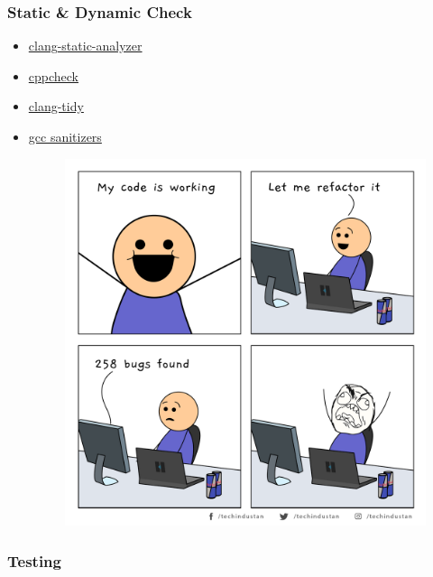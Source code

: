 \documentclass{beamer}
\begin{document}
\begin{frame}
\frametitle{Static \& Dynamic Check}
\begin{itemize}
    \setlength\itemsep{1em}
    \item \href{https://clang-analyzer.llvm.org/}{clang-static-analyzer}
    \item \href{http://cppcheck.net/}{cppcheck}
    \item \href{https://releases.llvm.org/12.0.0/tools/clang/tools/extra/docs/clang-tidy/index.html}{clang-tidy}
      \item \href{https://releases.llvm.org/12.0.0/tools/clang/tools/extra/docs/clang-tidy/index.html}{gcc sanitizers}

\begin{figure}[r]
\centering
\includegraphics[scale=0.05, right]{working.png}
\end{figure}

\end{itemize}

\end{frame}

\begin{frame}
\frametitle{Testing}

\end{frame}
\end{document}
